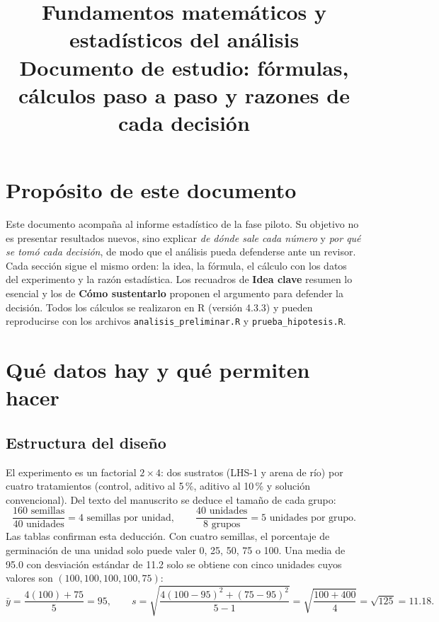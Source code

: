 \documentclass[11pt]{article}
\title{\textbf{Fundamentos matemáticos y estadísticos del análisis}\\[4pt]
\large Documento de estudio: fórmulas, cálculos paso a paso y razones de cada decisión}
\author{}
\date{}
\begin{document}
\maketitle
\vspace{-3em}

\section*{Propósito de este documento}

Este documento acompaña al informe estadístico de la fase piloto. Su objetivo no es presentar resultados nuevos, sino explicar \emph{de dónde sale cada número} y \emph{por qué se tomó cada decisión}, de modo que el análisis pueda defenderse ante un revisor. Cada sección sigue el mismo orden: la idea, la fórmula, el cálculo con los datos del experimento y la razón estadística. Los recuadros de \textbf{Idea clave} resumen lo esencial y los de \textbf{Cómo sustentarlo} proponen el argumento para defender la decisión. Todos los cálculos se realizaron en R (versión 4.3.3) y pueden reproducirse con los archivos \texttt{analisis\_preliminar.R} y \texttt{prueba\_hipotesis.R}.

\tableofcontents

\section{Qué datos hay y qué permiten hacer}

\subsection{Estructura del diseño}

El experimento es un factorial $2 \times 4$: dos sustratos (LHS-1 y arena de río) por cuatro tratamientos (control, aditivo al 5\,\%, aditivo al 10\,\% y solución convencional). Del texto del manuscrito se deduce el tamaño de cada grupo:
\[
\frac{160 \text{ semillas}}{40 \text{ unidades}} = 4 \text{ semillas por unidad}, \qquad
\frac{40 \text{ unidades}}{8 \text{ grupos}} = 5 \text{ unidades por grupo}.
\]
Las tablas confirman esta deducción. Con cuatro semillas, el porcentaje de germinación de una unidad solo puede valer 0, 25, 50, 75 o 100. Una media de 95.0 con desviación estándar de 11.2 solo se obtiene con cinco unidades cuyos valores son $(100, 100, 100, 100, 75)$:
\[
\bar{y} = \frac{4(100) + 75}{5} = 95, \qquad
s = \sqrt{\frac{4(100-95)^2 + (75-95)^2}{5-1}} = \sqrt{\frac{100 + 400}{4}} = \sqrt{125} = 11.18 .
\]
\end{document}
